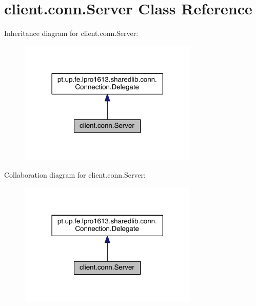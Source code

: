 \hypertarget{classclient_1_1conn_1_1_server}{}\section{client.\+conn.\+Server Class Reference}
\label{classclient_1_1conn_1_1_server}


Inheritance diagram for client.\+conn.\+Server\+:
\nopagebreak
\begin{figure}[H]
\begin{center}
\leavevmode
\includegraphics[width=242pt]{classclient_1_1conn_1_1_server__inherit__graph}
\end{center}
\end{figure}


Collaboration diagram for client.\+conn.\+Server\+:
\nopagebreak
\begin{figure}[H]
\begin{center}
\leavevmode
\includegraphics[width=242pt]{classclient_1_1conn_1_1_server__coll__graph}
\end{center}
\end{figure}

